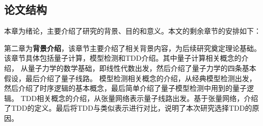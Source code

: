 \subsection*{论文结构}
本章为绪论，主要介绍了研究的背景、目的和意义。本文的剩余章节的安排如下：

第二章为\textbf{背景介绍}，该章节主要介绍了相关背景内容，为后续研究奠定理论基础。该章节具体包括量子计算，模型检测和TDD介绍。其中量子计算相关概念的介绍，
从量子力学的数学基础，即线性代数出发，然后介绍了量子力学的四条基本假设，最后介绍了量子线路。
模型检测相关概念的介绍，从经典模型检测出发，然后介绍了时序逻辑的基本概念，最后简单介绍了量子模型检测中用到的量子逻辑。
TDD相关概念的介绍，从张量网络表示量子线路出发。基于张量网络，介绍了TDD的定义。最后将TDD与类似表示进行对比，说明了本次研究选择TDD的原因。


